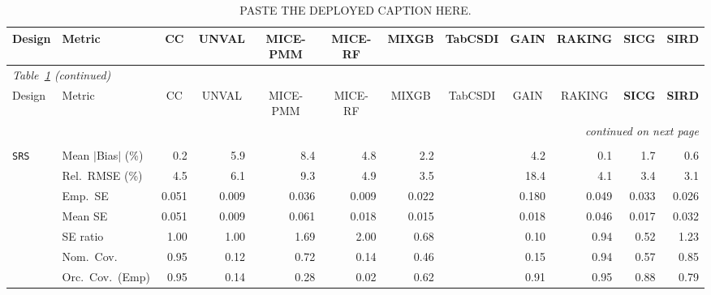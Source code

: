 \begin{landscape}
\footnotesize\setlength{\tabcolsep}{3.5pt}
\begin{longtable}{llrrrrrrrrrr}
\caption{PASTE THE DEPLOYED CAPTION HERE.}
\label{tab:appc_surv_SampleOE} \\
\toprule
Design & Metric & \multicolumn{1}{c}{CC} & \multicolumn{1}{c}{UNVAL} & \multicolumn{1}{c}{MICE-PMM} & \multicolumn{1}{c}{MICE-RF} & \multicolumn{1}{c}{MIXGB} & \multicolumn{1}{c}{TabCSDI} & \multicolumn{1}{c}{GAIN} & \multicolumn{1}{c}{RAKING} & \multicolumn{1}{c}{\textbf{SICG}} & \multicolumn{1}{c}{\textbf{SIRD}} \\
\midrule \endfirsthead
\multicolumn{12}{l}{\footnotesize\itshape Table~\ref{tab:appc_surv_SampleOE} (continued)} \\
\toprule
Design & Metric & \multicolumn{1}{c}{CC} & \multicolumn{1}{c}{UNVAL} & \multicolumn{1}{c}{MICE-PMM} & \multicolumn{1}{c}{MICE-RF} & \multicolumn{1}{c}{MIXGB} & \multicolumn{1}{c}{TabCSDI} & \multicolumn{1}{c}{GAIN} & \multicolumn{1}{c}{RAKING} & \multicolumn{1}{c}{\textbf{SICG}} & \multicolumn{1}{c}{\textbf{SIRD}} \\
\midrule \endhead
\midrule \multicolumn{12}{r}{\footnotesize\itshape continued on next page} \\
\endfoot
\bottomrule \endlastfoot
\multicolumn{12}{l}{\textbf{Continuous Phase-Two Covariates}} \\
\addlinespace[2pt]
\quad \texttt{SRS} & Mean $|$Bias$|$ (\%) & \cellcolor{ranktwo}0.2 & 5.9 & 8.4 & 4.8 & 2.2 &  & 4.2 & \cellcolor{rankone}0.1 & 1.7 & \cellcolor{rankthree}0.6 \\
 & Rel.\ RMSE (\%) & 4.5 & 6.1 & 9.3 & 4.9 & \cellcolor{rankthree}3.5 &  & 18.4 & 4.1 & \cellcolor{ranktwo}3.4 & \cellcolor{rankone}3.1 \\
 & Emp.\ SE & 0.051 & 0.009 & 0.036 & 0.009 & 0.022 &  & 0.180 & 0.049 & 0.033 & 0.026 \\
 & Mean SE & 0.051 & 0.009 & 0.061 & 0.018 & 0.015 &  & 0.018 & 0.046 & 0.017 & 0.032 \\
 & SE ratio & \cellcolor{rankone}1.00 & \cellcolor{ranktwo}1.00 & 1.69 & 2.00 & 0.68 &  & 0.10 & \cellcolor{rankthree}0.94 & 0.52 & 1.23 \\
 & Nom.\ Cov. & \cellcolor{rankone}0.95 & 0.12 & 0.72 & 0.14 & 0.46 &  & 0.15 & \cellcolor{ranktwo}0.94 & 0.57 & \cellcolor{rankthree}0.85 \\
 & Orc.\ Cov.\ (Emp) & \cellcolor{ranktwo}0.95 & 0.14 & 0.28 & 0.02 & 0.62 &  & \cellcolor{rankthree}0.91 & \cellcolor{rankone}0.95 & 0.88 & 0.79 \\

\end{longtable}
\end{landscape}
